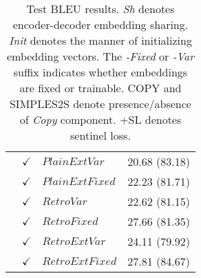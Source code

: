 \documentclass[11pt,letterpaper]{article}
\begin{document}
\begin{table}
\begin{tabular}{|l|l|l|l| }
 & $\checkmark$ & $PlainExtVar$  & 20.68 (83.18) \\
 & $\checkmark$ & $PlainExtFixed$  & 22.23 (81.71) \\
 & $\checkmark$ & $RetroVar$ &  22.62 (81.15) \\ 
 & $\checkmark$ & $RetroFixed$ &  27.66 (81.35) \\
 & $\checkmark$ & $RetroExtVar$  & 24.11 (79.92) \\ 
 & $\checkmark$ & $RetroExtFixed$  & 27.81 (84.67) \\
 \hline 
\end{tabular}
\caption{Test BLEU results. \emph{Sh} denotes encoder-decoder embedding sharing. \emph{Init} denotes the manner of initializing embedding vectors. The \emph{-Fixed} or \emph{-Var} suffix indicates whether embeddings are fixed or trainable. \textsc{COPY} and \textsc{SIMPLES2S} denote presence/absence of \textit{Copy} component. \textsc{+SL} denotes sentinel loss.}
\textbf{\label{tab:knightExp}}
\end{table}




%
%
\end{document}
